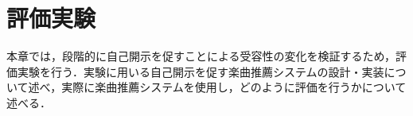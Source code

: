 \chapter{評価実験}
本章では，段階的に自己開示を促すことによる受容性の変化を検証するため，評価実験を行う．実験に用いる自己開示を促す楽曲推薦システムの設計・実装について述べ，実際に楽曲推薦システムを使用し，どのように評価を行うかについて述べる．





